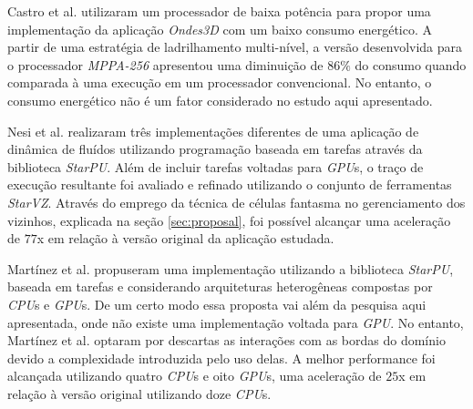 \documentclass[cic,tc]{iiufrgs}
\begin{document}
Castro et al. \cite{CASTRO2016108} utilizaram um processador de baixa potência para propor uma implementação da aplicação \textit{Ondes3D} com um baixo consumo energético. A partir
de uma estratégia de ladrilhamento multi-nível, a versão desenvolvida para o processador \textit{MPPA-256} apresentou uma diminuição de $86\%$ do consumo quando comparada à uma
execução em um processador convencional. No entanto, o consumo energético não é um fator considerado no estudo aqui apresentado.

Nesi et al. \cite{nesi} realizaram três implementações diferentes de uma aplicação de dinâmica de fluídos utilizando programação baseada em tarefas através da biblioteca \textit{StarPU}.
Além de incluir tarefas voltadas para \textit{GPU}s, o traço de execução resultante foi avaliado e refinado utilizando o conjunto de ferramentas \textit{StarVZ}. Através do emprego da técnica de
células fantasma no gerenciamento dos vizinhos, explicada na seção \ref{sec:proposal}, foi possível alcançar uma aceleração de $77$x em relação à versão original da aplicação estudada.

Martínez et al. \cite{victor} propuseram uma implementação utilizando a biblioteca \textit{StarPU}, baseada em tarefas e considerando arquiteturas heterogêneas compostas por
\textit{CPU}s e \textit{GPU}s. De um certo modo essa proposta vai além da pesquisa aqui apresentada, onde não existe uma implementação voltada para \textit{GPU}. No entanto, Martínez et al.
optaram por descartas as interações com as bordas do domínio devido a complexidade introduzida pelo uso delas. A melhor performance foi alcançada utilizando quatro \textit{CPU}s e oito
\textit{GPU}s, uma aceleração de $25$x em relação à versão original utilizando doze \textit{CPU}s.
\end{document}
